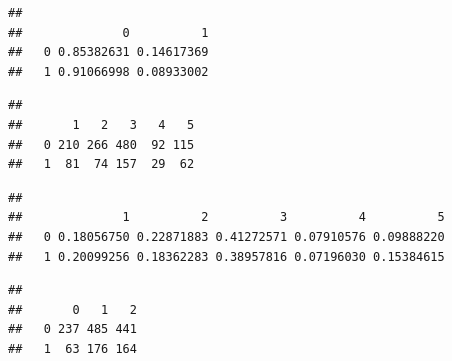 \documentclass[
  10pt,
]{book}
\newenvironment{Shaded}{\begin{snugshade}}{\end{snugshade}}
\newcommand{\DecValTok}[1]{\textcolor[rgb]{0.00,0.00,0.81}{#1}}
\newcommand{\FunctionTok}[1]{\textcolor[rgb]{0.00,0.00,0.00}{#1}}
\newcommand{\NormalTok}[1]{#1}
\newcommand{\SpecialCharTok}[1]{\textcolor[rgb]{0.00,0.00,0.00}{#1}}
\begin{document}
\begin{verbatim}
##    
##              0          1
##   0 0.85382631 0.14617369
##   1 0.91066998 0.08933002
\end{verbatim}

\begin{Shaded}
\end{Shaded}

\begin{verbatim}
##    
##       1   2   3   4   5
##   0 210 266 480  92 115
##   1  81  74 157  29  62
\end{verbatim}

\begin{Shaded}
\end{Shaded}

\begin{verbatim}
##    
##              1          2          3          4          5
##   0 0.18056750 0.22871883 0.41272571 0.07910576 0.09888220
##   1 0.20099256 0.18362283 0.38957816 0.07196030 0.15384615
\end{verbatim}

\begin{Shaded}
\end{Shaded}

\begin{verbatim}
##    
##       0   1   2
##   0 237 485 441
##   1  63 176 164
\end{verbatim}

\begin{Shaded}
\end{Shaded}
\end{document}
